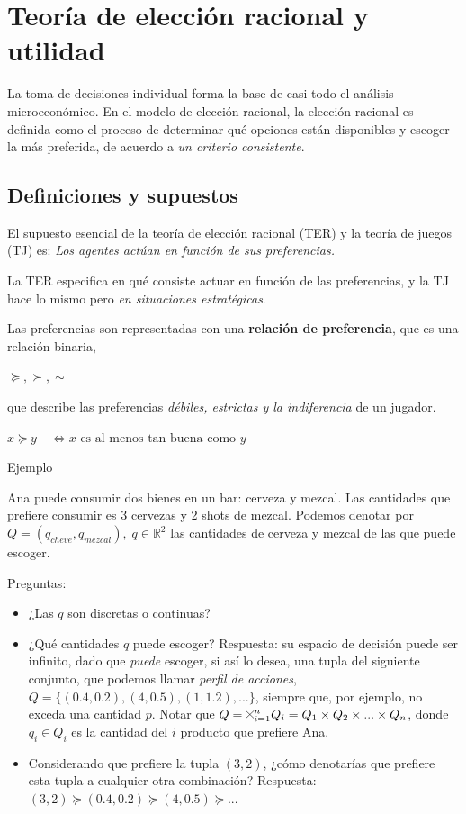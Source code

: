 \documentclass[12pt]{scrartcl}
\theoremstyle{definition}
\newcommand{\Cross}{\mathbin{\tikz [x=1.4ex,y=1.4ex,line width=.1ex] \draw (0,0) -- (1,1) (0,1) -- (1,0);}}%
\begin{document}
\section{Teoría de elección racional y utilidad}

La toma de decisiones individual forma la base de casi todo el análisis microeconómico. En el modelo de elección racional, la elección racional es definida como el proceso de determinar qué opciones están disponibles y escoger la más preferida, de acuerdo a \textit{un criterio consistente}. 

\subsection{Definiciones y supuestos}

El supuesto esencial de la teoría de elección racional (TER) y la teoría de juegos (TJ) es: \textit{Los agentes actúan en función de sus preferencias.} 

La TER especifica en qué consiste actuar en función de las preferencias, y la TJ hace lo mismo pero \textit{en situaciones estratégicas}. 

Las preferencias son representadas con una \textbf{relación de preferencia}, que es una relación binaria,
\begin{center}
    $\succeq, \succ, \sim$
\end{center}
que describe las preferencias \textit{débiles, estrictas y la indiferencia} de un jugador.

\begin{center}
    $x \succeq y\quad \Longleftrightarrow x \text{ es al menos tan buena como } y$
\end{center}

\begin{exbox}{Ejemplo}

Ana puede consumir dos bienes en un bar: cerveza y mezcal. Las cantidades que prefiere consumir es 3 cervezas y 2 shots de mezcal. Podemos denotar por $Q=(q_{cheve}, q_{mezcal}),\; q \in \mathbb{R}^2$ las cantidades de cerveza y mezcal de las que puede escoger. 

Preguntas: 

\begin{itemize}
    \item ¿Las $q$ son discretas o continuas?
    \item ¿Qué cantidades $q$ puede escoger? Respuesta: su espacio de decisión puede ser infinito, dado que \textit{puede} escoger, si así lo desea, una tupla del siguiente conjunto, que podemos llamar \textit{perfil de acciones}, $Q=\{(0.4, 0.2), (4, 0.5), (1, 1.2), ...\}$, siempre que, por ejemplo, no exceda una cantidad $p$. Notar que $Q=\Cross_{i=1}^n Q_i = Q_1 \times Q_2 \times ... \times Q_n$, donde $q_i \in Q_i$ es la cantidad del $i$ producto que prefiere Ana.
    \item Considerando que prefiere la tupla $(3, 2)$, ¿cómo denotarías que prefiere esta tupla a cualquier otra combinación? Respuesta: $(3, 2) \succeq (0.4, 0.2) \succeq (4, 0.5) \succeq ...$
\end{itemize}
\end{exbox}
\end{document}
